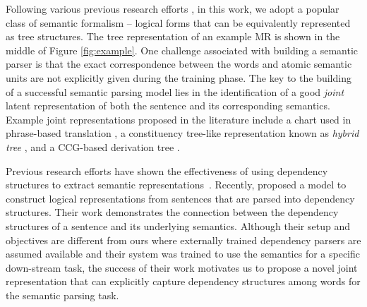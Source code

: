 Following various previous research efforts \cite{wong2006learning,lu2008generative,jones2012semantic},  in this work, we adopt a popular class of semantic formalism -- logical forms that can be equivalently represented as tree structures.
The  tree representation of an example MR is shown in the middle of Figure \ref{fig:example}.
One challenge associated with building a semantic parser is that the exact correspondence between the words and atomic semantic units are not explicitly given during the training phase.
The key to the building of a successful semantic parsing model lies in the identification of a good {\em joint} latent representation of both the sentence and its corresponding semantics.
Example joint representations proposed in the literature include a chart used in phrase-based translation \cite{wong2006learning}, a constituency tree-like representation known as {\em hybrid tree} \cite{lu2008generative}, and a CCG-based derivation tree \cite{kwiatkowski2010inducing}.

Previous research efforts have shown the effectiveness of using dependency structures to extract semantic representations~\cite{debusmann2004relational,cimiano2009flexible,bedaride2011deep,stanovsky2016getting}. 
Recently, \citet{reddy2016transforming,reddy2017universal} proposed a model to construct logical representations from sentences that are parsed into dependency structures.
Their work demonstrates the connection between the dependency structures of a sentence and its underlying semantics.
Although their setup and objectives are different from ours where externally trained dependency parsers are assumed available and their system was trained to use the semantics for a specific down-stream task, the success of their work motivates us to propose a novel joint  representation that can explicitly capture dependency structures among words for the semantic parsing task.




